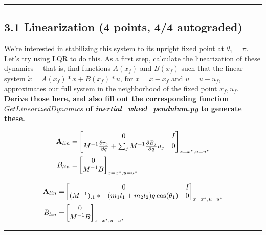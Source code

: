 \documentclass[11pt]{article}
\begin{document}
    \begin{center}\rule{0.5\linewidth}{\linethickness}\end{center}

\subsection{3.1 Linearization (4 points, 4/4
autograded)}\label{linearization-4-points-44-autograded}

We're interested in stabilizing this system to its upright fixed point
at \(\theta_1 = \pi\). Let's try using LQR to do this. As a first step,
calculate the linearization of these dynamics -\/- that is, find
functions \(A(x_f)\) and \(B(x_f)\) such that the linear system
\(\dot x = A(x_f)*\bar{x} + B(x_f)*\bar{u}\), for \(\bar{x} = x-x_f\)
and \(\bar{u} = u-u_f\), approximates our full system in the
neighborhood of the fixed point \(x_f, u_f\). \textbf{Derive those here,
and also fill out the corresponding function \(GetLinearizedDynamics\)
of \emph{inertial\_wheel\_pendulum.py} to generate these.}

    \begin{align}
      {\bf A}_{lin} =& \begin{bmatrix} {0} & {I} \\ M^{-1} \frac{\partial \tau_g}{\partial q} + \sum_{j} M^{-1}\frac{\partial B_j}{\partial q} u_j  & {0} \end{bmatrix}_{x=x^*,u=u^*} \\
      B_{lin} =& \begin{bmatrix} {0} \\ M^{-1} B
        \end{bmatrix}_{x=x^*, u=u^*}
      \end{align}

\begin{align}
{\bf A}_{lin} =&
\begin{bmatrix} {0} & {I} \\ (M^{-1})_{.1} * -(m_1 l_1 + m_2 l_2) g \cos(\theta_1)& {0} \end{bmatrix}_{x=x^*,u=u^*} \\
B_{lin} =& \begin{bmatrix}
{0} \\
M^{-1} B
\end{bmatrix}_{x=x^*, u=u^*}
\end{align}

    \begin{center}\rule{0.5\linewidth}{\linethickness}\end{center}
\end{document}
